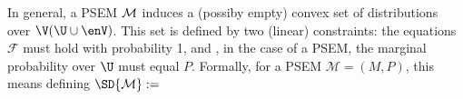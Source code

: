 In general, a PSEM $\cal M$
induces a (possiby empty) convex set of distributions over $\V(\U \cup \enV)$.
This set is defined by two (linear) constraints:
    the equations $\mathcal F$ must hold with probability 1, 
    and
    \unskip, in the case of a PSEM,
    the marginal probability over $\U$ must
    equal $P$. 
Formally, for a PSEM $\mathcal M = (M, P)$, this means defining
$\SD{\mathcal M} := $
